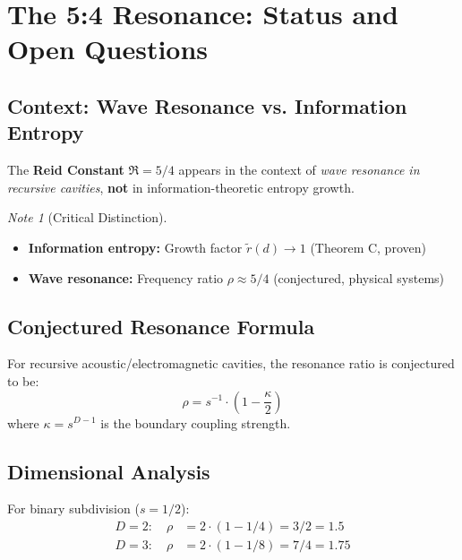 \documentclass[11pt,a4paper]{article}
\theoremstyle{definition}
\theoremstyle{remark}
\newtheorem*{note}{Note}
\newcommand{\rtilde}{\tilde{r}}
\begin{document}
\section{The 5:4 Resonance: Status and Open Questions}
\label{sec:resonance}

\subsection{Context: Wave Resonance vs. Information Entropy}

The \textbf{Reid Constant} $\mathfrak{R} = 5/4$ appears in the context of \emph{wave resonance in recursive cavities}, \textbf{not} in information-theoretic entropy growth.

\begin{note}[Critical Distinction]
\begin{itemize}
    \item \textbf{Information entropy:} Growth factor $\rtilde(d) \to 1$ (Theorem C, proven)
    \item \textbf{Wave resonance:} Frequency ratio $\rho \approx 5/4$ (conjectured, physical systems)
\end{itemize}
\end{note}

\subsection{Conjectured Resonance Formula}

For recursive acoustic/electromagnetic cavities, the resonance ratio is conjectured to be:
\begin{equation}
    \rho = s^{-1} \cdot \left(1 - \frac{\kappa}{2}\right)
    \label{eq:resonance}
\end{equation}
where $\kappa = s^{D-1}$ is the boundary coupling strength.

\subsection{Dimensional Analysis}

For binary subdivision ($s = 1/2$):
\begin{align}
    D = 2: \quad \rho &= 2 \cdot (1 - 1/4) = 3/2 = 1.5 \\
    D = 3: \quad \rho &= 2 \cdot (1 - 1/8) = 7/4 = 1.75
\end{align}
\end{document}
